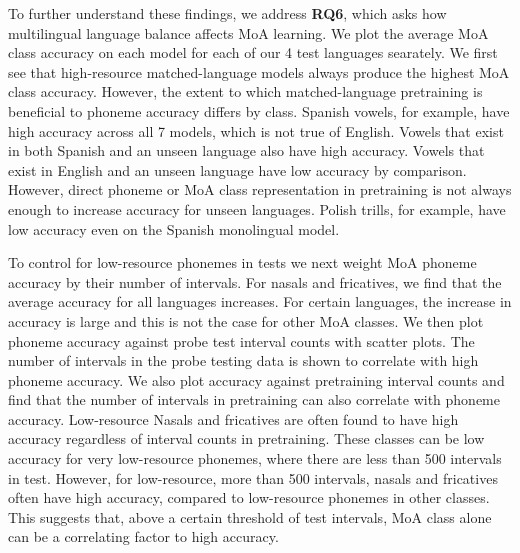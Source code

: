 
To further understand these findings, we address \textbf{RQ6}, which asks how multilingual language balance affects MoA learning. We plot the average MoA class accuracy on each model for each of our 4 test languages searately. We first see that high-resource matched-language models always produce the highest MoA class accuracy. However, the extent to which matched-language pretraining is beneficial to phoneme accuracy differs by class. Spanish vowels, for example, have high accuracy across all 7 models, which is not true of English. Vowels that exist in both Spanish and an unseen language also have high accuracy. Vowels that exist in English and an unseen language have low accuracy by comparison. However, direct phoneme or MoA class representation in pretraining is not always enough to increase accuracy for unseen languages. Polish trills, for example, have low accuracy even on the Spanish monolingual model.

To control for low-resource phonemes in tests we next weight MoA phoneme accuracy by their number of intervals. For nasals and fricatives, we find that the average accuracy for all languages increases. For certain languages, the increase in accuracy is large and this is not the case for other MoA classes. We then plot phoneme accuracy against probe test interval counts with scatter plots. The number of intervals in the probe testing data is shown to correlate with high phoneme accuracy. We also plot accuracy against pretraining interval counts and find that the number of intervals in pretraining can also correlate with phoneme accuracy. Low-resource Nasals and fricatives are often found to have high accuracy regardless of interval counts in pretraining. These classes can be low accuracy for very low-resource phonemes, where there are less than 500 intervals in test. However, for low-resource, more than 500 intervals, nasals and fricatives often have high accuracy, compared to low-resource phonemes in other classes. This suggests that, above a certain threshold of test intervals, MoA class alone can be a correlating factor to high accuracy.

